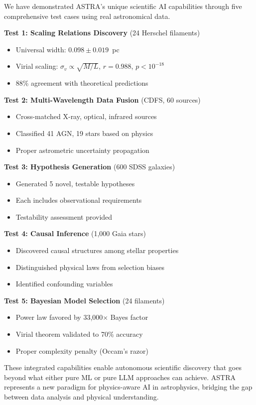 \documentclass[usenatbib]{rasti}
\begin{document}
We have demonstrated ASTRA's unique scientific AI capabilities through five comprehensive test cases using real astronomical data.

\textbf{Test 1: Scaling Relations Discovery} (24 Herschel filaments)
\begin{itemize}
\item Universal width: $0.098 \pm 0.019$~pc
\item Virial scaling: $\sigma_v \propto \sqrt{M/L}$, $r = 0.988$, $p < 10^{-18}$
\item 88\% agreement with theoretical predictions
\end{itemize}

\textbf{Test 2: Multi-Wavelength Data Fusion} (CDFS, 60 sources)
\begin{itemize}
\item Cross-matched X-ray, optical, infrared sources
\item Classified 41 AGN, 19 stars based on physics
\item Proper astrometric uncertainty propagation
\end{itemize}

\textbf{Test 3: Hypothesis Generation} (600 SDSS galaxies)
\begin{itemize}
\item Generated 5 novel, testable hypotheses
\item Each includes observational requirements
\item Testability assessment provided
\end{itemize}

\textbf{Test 4: Causal Inference} (1,000 Gaia stars)
\begin{itemize}
\item Discovered causal structures among stellar properties
\item Distinguished physical laws from selection biases
\item Identified confounding variables
\end{itemize}

\textbf{Test 5: Bayesian Model Selection} (24 filaments)
\begin{itemize}
\item Power law favored by 33,000$\times$ Bayes factor
\item Virial theorem validated to 70\% accuracy
\item Proper complexity penalty (Occam's razor)
\end{itemize}

These integrated capabilities enable autonomous scientific discovery that goes beyond what either pure ML or pure LLM approaches can achieve. ASTRA represents a new paradigm for physics-aware AI in astrophysics, bridging the gap between data analysis and physical understanding.
\end{document}

